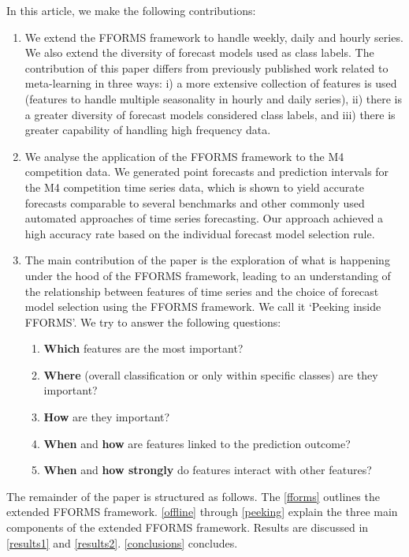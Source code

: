 \documentclass[11pt,a4paper,]{article}
\providecommand{\tightlist}{%
  \setlength{\itemsep}{0pt}\setlength{\parskip}{0pt}}
\begin{document}
In this article, we make the following contributions:

\begin{enumerate}
\def\labelenumi{\arabic{enumi}.}
\tightlist
\item
  We extend the FFORMS framework to handle weekly, daily and hourly series. We also extend the diversity of forecast models used as class labels. The contribution of this paper differs from previously published work related to meta-learning \autocites{prudencio2004meta}{lemke2010meta}{kuck2016meta} in three ways: i) a more extensive collection of features is used (features to handle multiple seasonality in hourly and daily series), ii) there is a greater diversity of forecast models considered class labels, and iii) there is greater capability of handling high frequency data.
\item
  We analyse the application of the FFORMS framework to the M4 competition data. We generated point forecasts and prediction intervals for the M4 competition time series data, which is shown to yield accurate forecasts comparable to several benchmarks and other commonly used automated approaches of time series forecasting. Our approach achieved a high accuracy rate based on the individual forecast model selection rule.
\item
  The main contribution of the paper is the exploration of what is happening under the hood of the FFORMS framework, leading to an understanding of the relationship between features of time series and the choice of forecast model selection using the FFORMS framework. We call it `Peeking inside FFORMS'. We try to answer the following questions:

  \begin{enumerate}
  \def\labelenumii{\roman{enumii})}
  \tightlist
  \item
    \textbf{Which} features are the most important?
  \item
    \textbf{Where} (overall classification or only within specific classes) are they important?
  \item
    \textbf{How} are they important?
  \item
    \textbf{When} and \textbf{how} are features linked to the prediction outcome?
  \item
    \textbf{When} and \textbf{how strongly} do features interact with other features?
  \end{enumerate}
\end{enumerate}

The remainder of the paper is structured as follows. The \autoref{fforms} outlines the extended FFORMS framework. \autoref{offline} through \autoref{peeking} explain the three main components of the extended FFORMS framework. Results are discussed in \autoref{results1} and \autoref{results2}. \autoref{conclusions} concludes.
\end{document}
